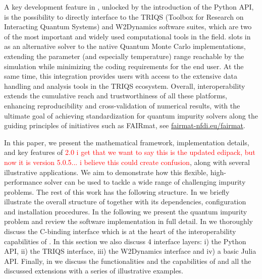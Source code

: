 \documentclass[edipack_sp.tex]{subfiles}
\begin{document}
A key development feature in \NAME, unlocked by the introduction of the Python API, 
is the possibility to directly interface to the TRIQS (Toolbox for Research on Interacting Quantum Systems) and
W2Dynamics software suites, which are two of the most important and widely used computational tools in
the field. \NAME slots in as an alternative solver to the native Quantum Monte Carlo 
implementations, extending the parameter (and especially temperature) range reachable by 
the simulation while minimizing the coding requirements for the end user.
At the same time, this integration provides \NAME users with access to the
extensive data handling and analysis tools in the TRIQS ecosystem. 
Overall, interoperability extends the cumulative reach and trustworthiness of all these platforms,
enhancing reproducibility and cross-validation of numerical results, with the ultimate goal of achieving standardization for quantum impurity solvers along the guiding principles of initiatives such as FAIRmat, see \href{https://www.fairmat-nfdi.eu/fairmat/}{fairmat-nfdi.eu/fairmat}. 

In this paper, we present the mathematical framework, implementation
details, and key features of \NAME \textcolor{red}{2.0 i get that we want to say this is the updated edipack, but now it is version 5.0.5... i believe this could create confusion}, along with several illustrative
applications. We aim to demonstrate how this flexible,
high-performance solver can be used to tackle a wide range of
challenging impurity problems. 
The rest of this work has the following structure. In  we 
briefly illustrate the overall structure of \NAME together with its dependencies, configuration
and installation procedures. In the following   we present the quantum impurity
problem and review the software implementation in full detail. In  we thoroughly discuss the C-binding interface which is at the heart of the 
interoperability capabilities of \NAME. In this section we also discuss 4 interface layers: i) 
the Python API, ii) the TRIQS interface, iii) the W2Dynamics interface and iv) a basic Julia API.
Finally, in  we discuss the functionalities and the capabilities of \NAME and 
all the discussed extensions with a series of illustrative examples. 

\ifSubfilesClassLoaded{
  
}{}
\end{document}
